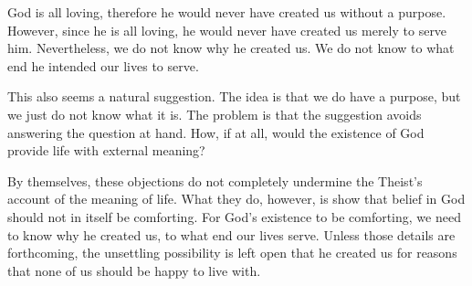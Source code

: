 \documentclass[]{article}
\begin{document}
God is all loving, therefore he would never have created us without a
purpose. However, since he is all loving, he would never have created us
merely to serve him. Nevertheless, we do not know why he created us. We
do not know to what end he intended our lives to serve.

This also seems a natural suggestion. The idea is that we do have a
purpose, but we just do not know what it is. The problem is that the
suggestion avoids answering the question at hand. How, if at all, would
the existence of God provide life with external meaning?

By themselves, these objections do not completely undermine the Theist's
account of the meaning of life. What they do, however, is show that
belief in God should not in itself be comforting. For God's existence to
be comforting, we need to know why he created us, to what end our lives
serve. Unless those details are forthcoming, the unsettling possibility
is left open that he created us for reasons that none of us should be
happy to live with.
\end{document}
